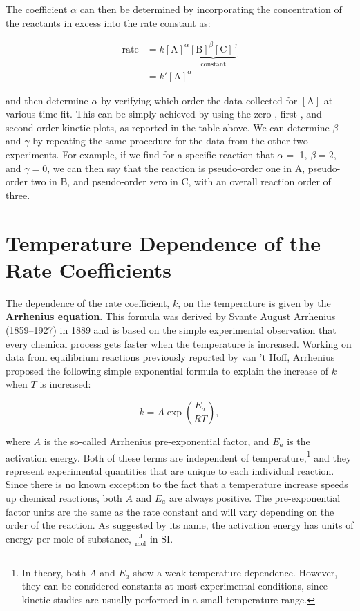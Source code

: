 \documentclass[
  9pt,
]{extbook}
\theoremstyle{definition}
\theoremstyle{definition}
\theoremstyle{definition}
\theoremstyle{remark}
\begin{document}
The coefficient \(\alpha\) can then be determined by incorporating the concentration of the reactants in excess into the rate constant as:

\begin{equation}
\begin{aligned}
\text{rate}&=k[\mathrm{A}]^{\alpha}\underbrace{[\mathrm{B}]^{\beta}[\mathrm{C}]^{\gamma}}_{\text{constant}} \\
&= k'[\mathrm{A}]^{\alpha}
\end{aligned}
\end{equation}

and then determine \(\alpha\) by verifying which order the data collected for \([\mathrm{A}]\) at various time fit. This can be simply achieved by using the zero-, first-, and second-order kinetic plots, as reported in the table above. We can determine \(\beta\) and \(\gamma\) by repeating the same procedure for the data from the other two experiments. For example, if we find for a specific reaction that \(\alpha=\) 1, \(\beta=2\), and \(\gamma=0\), we can then say that the reaction is pseudo-order one in \(\mathrm{A}\), pseudo-order two in \(\mathrm{B}\), and pseudo-order zero in \(\mathrm{C}\), with an overall reaction order of three.

\hypertarget{temperature-dependence-of-the-rate-coefficients}{%
\section{Temperature Dependence of the Rate Coefficients}\label{temperature-dependence-of-the-rate-coefficients}}

The dependence of the rate coefficient, \(k\), on the temperature is given by the \textbf{Arrhenius equation}. This formula was derived by Svante August Arrhenius (1859--1927) in 1889 and is based on the simple experimental observation that every chemical process gets faster when the temperature is increased. Working on data from equilibrium reactions previously reported by van 't Hoff, Arrhenius proposed the following simple exponential formula to explain the increase of \(k\) when \(T\) is increased:

\begin{equation}
k=A\exp\left( \frac{E_a}{RT}\right),
\label{eq:Arr1}
\end{equation}

where \(A\) is the so-called Arrhenius pre-exponential factor, and \(E_a\) is the activation energy. Both of these terms are independent of temperature,\footnote{In theory, both \(A\) and \(E_a\) show a weak temperature dependence. However, they can be considered constants at most experimental conditions, since kinetic studies are usually performed in a small temperature range.} and they represent experimental quantities that are unique to each individual reaction. Since there is no known exception to the fact that a temperature increase speeds up chemical reactions, both \(A\) and \(E_a\) are always positive. The pre-exponential factor units are the same as the rate constant and will vary depending on the order of the reaction. As suggested by its name, the activation energy has units of energy per mole of substance, \(\frac{\mathrm{J}}{\mathrm{mol}}\) in SI.
\end{document}

